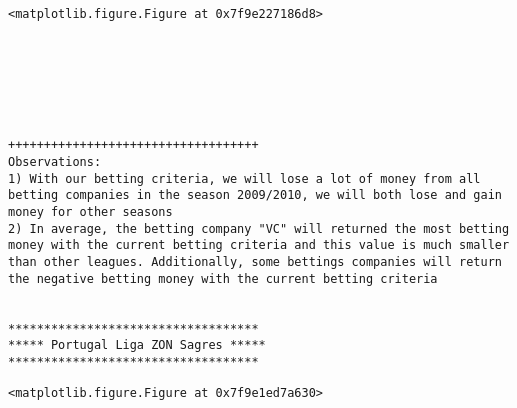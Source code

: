 \documentclass[11pt]{article}
\begin{document}
    
    \begin{verbatim}
<matplotlib.figure.Figure at 0x7f9e227186d8>
    \end{verbatim}

    
    \begin{center}
    \end{center}
    { \hspace*{\fill} \\}
    
    \begin{center}
    \end{center}
    { \hspace*{\fill} \\}
    
    \begin{center}
    \end{center}
    { \hspace*{\fill} \\}
    
    \begin{Verbatim}[commandchars=\\\{\}]
+++++++++++++++++++++++++++++++++++
Observations: 
1) With our betting criteria, we will lose a lot of money from all betting companies in the season 2009/2010, we will both lose and gain money for other seasons
2) In average, the betting company "VC" will returned the most betting money with the current betting criteria and this value is much smaller than other leagues. Additionally, some bettings companies will return the negative betting money with the current betting criteria


***********************************
***** Portugal Liga ZON Sagres *****
***********************************

    \end{Verbatim}

    
    \begin{verbatim}
<matplotlib.figure.Figure at 0x7f9e1ed7a630>
    \end{verbatim}

    
    \begin{center}
    \end{center}
    { \hspace*{\fill} \\}
    
\end{document}

